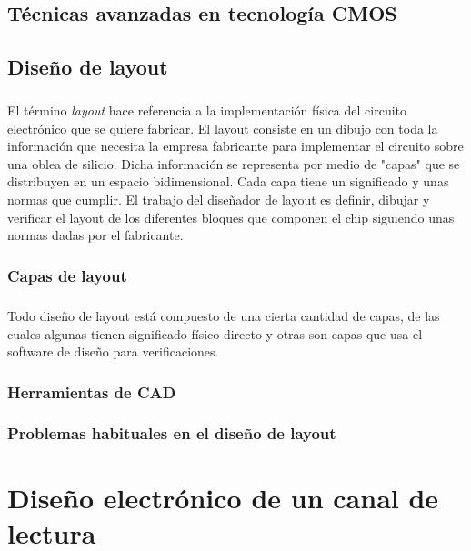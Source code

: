\documentclass[12pt,a4paper,oneside,titlepage]{report}
\begin{document}
\section{Técnicas avanzadas en tecnología CMOS}

\section{Diseño de layout}

\paragraph{}
El término \textit{layout} hace referencia a la implementación física del circuito
electrónico que se quiere fabricar. El layout consiste en un dibujo con toda
la información que necesita la empresa fabricante para implementar el circuito
sobre una oblea de silicio. Dicha información se representa por medio de "capas"
que se distribuyen en un espacio bidimensional. Cada capa tiene un significado y
unas normas que cumplir. El trabajo del diseñador de layout es definir, dibujar y
verificar el layout de los diferentes bloques que componen el chip siguiendo
unas normas dadas por el fabricante.

\subsection{Capas de layout}

\paragraph{}
Todo diseño de layout está compuesto de una cierta cantidad de capas, de las cuales
algunas tienen significado físico directo y otras son capas que usa el software de
diseño para verificaciones.

\subsection{Herramientas de CAD}

\subsection{Problemas habituales en el diseño de layout}

\chapter{Diseño electrónico de un canal de lectura}
\end{document}
